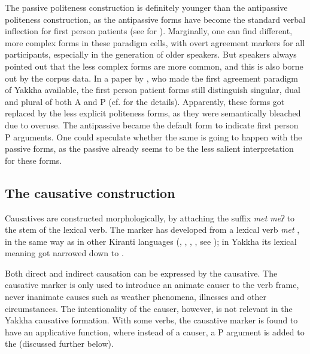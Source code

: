 The passive politeness construction is definitely younger than the antipassive politeness construction, as the antipassive forms have become the standard verbal inflection for first person patients (see  for ). Marginally, one can find different, more complex forms in these paradigm cells, with overt agreement markers for all participants, especially in the generation of older speakers. But speakers always pointed out that the less complex forms are more common, and this is also borne out by the corpus data. In a paper by \citet[425]{Gvozdanovic1987How}, who made the first agreement paradigm of Yakkha available, the first person patient forms still distinguish singular, dual and plural  of both A and P (cf.  for the details). Apparently, these forms got replaced by the less explicit politeness forms, as they were semantically bleached due to overuse. The antipassive became the default form to indicate first person P arguments. One could speculate whether the same is going to happen with the passive forms, as the passive already seems to be the less salient interpretation for these forms.




\subsection{The causative construction}\label{caus}

Causatives are constructed morphologically, by attaching the suffix \emph{met \ti meʔ} to the stem of the lexical verb. The marker has developed from a lexical verb \emph{met} , in the same way as in other Kiranti languages (, , , , see \citealt{Driem1987A-grammar, Bickeletal2006The-Chintang, Doornenbal2009A-grammar}); in Yakkha its lexical meaning got narrowed down to . 

Both direct and indirect causation can be expressed by the causa\-tive. The causative marker is only used to introduce an animate causer to the verb frame, never inanimate causes such as weather phenomena, illnesses and other circumstances. The intentionality of the causer, however, is not relevant in the Yakkha causative formation. With some verbs, the causative marker is found to have an applicative function,  where instead of a causer, a P argument is added to the  (discussed further below).


